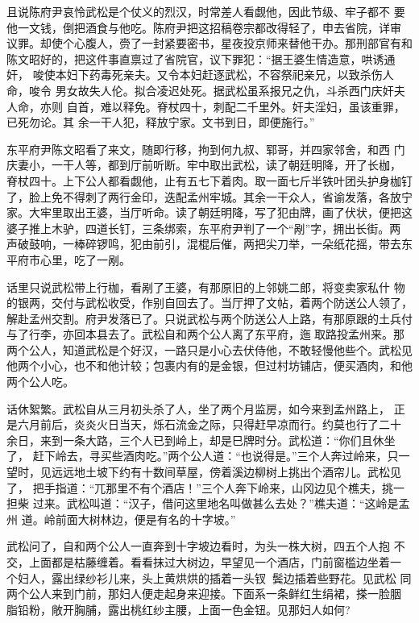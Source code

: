 且说陈府尹哀怜武松是个仗义的烈汉，时常差人看觑他，因此节级、牢子都不
要他一文钱，倒把酒食与他吃。陈府尹把这招稿卷宗都改得轻了，申去省院，详审
议罪。却使个心腹人，赍了一封紧要密书，星夜投京师来替他干办。那刑部官有和
陈文昭好的，把这件事直禀过了省院官，议下罪犯：“据王婆生情造意，哄诱通奸，
唆使本妇下药毒死亲夫。又令本妇赶逐武松，不容祭祀亲兄，以致杀伤人命，唆令
男女故失人伦。拟合凌迟处死。据武松虽系报兄之仇，斗杀西门庆奸夫人命，亦则
自首，难以释免。脊杖四十，刺配二千里外。奸夫淫妇，虽该重罪，已死勿论。其
余一干人犯，释放宁家。文书到日，即便施行。”

东平府尹陈文昭看了来文，随即行移，拘到何九叔、郓哥，并四家邻舍，和西
门庆妻小，一干人等，都到厅前听断。牢中取出武松，读了朝廷明降，开了长枷，
脊杖四十。上下公人都看觑他，止有五七下着肉。取一面七斤半铁叶团头护身枷钉
了，脸上免不得刺了两行金印，迭配孟州牢城。其余一干众人，省谕发落，各放宁
家。大牢里取出王婆，当厅听命。读了朝廷明降，写了犯由牌，画了伏状，便把这
婆子推上木驴，四道长钉，三条绑索，东平府尹判了一个“剐”字，拥出长街。两
声破鼓响，一棒碎锣鸣，犯由前引，混棍后催，两把尖刀举，一朵纸花摇，带去东
平府市心里，吃了一剐。

话里只说武松带上行枷，看剐了王婆，有那原旧的上邻姚二郎，将变卖家私什
物的银两，交付与武松收受，作别自回去了。当厅押了文帖，着两个防送公人领了，
解赴孟州交割。府尹发落已了。只说武松与两个防送公人上路，有那原跟的土兵付
与了行李，亦回本县去了。武松自和两个公人离了东平府，迤取路投孟州来。那
两个公人，知道武松是个好汉，一路只是小心去伏侍他，不敢轻慢他些个。武松见
他两个小心，也不和他计较；包裹内有的是金银，但过村坊铺店，便买酒肉，和他
两个公人吃。

话休絮繁。武松自从三月初头杀了人，坐了两个月监房，如今来到孟州路上，
正是六月前后，炎炎火日当天，烁石流金之际，只得赶早凉而行。约莫也行了二十
余日，来到一条大路，三个人已到岭上，却是巳牌时分。武松道：“你们且休坐了，
赶下岭去，寻买些酒肉吃。”两个公人道：“也说得是。”三个人奔过岭来，只一
望时，见远远地土坡下约有十数间草屋，傍着溪边柳树上挑出个酒帘儿。武松见了，
把手指道：“兀那里不有个酒店！”三个人奔下岭来，山冈边见个樵夫，挑一担柴
过来。武松叫道：“汉子，借问这里地名叫做甚么去处？”樵夫道：“这岭是孟州
道。岭前面大树林边，便是有名的十字坡。”

武松问了，自和两个公人一直奔到十字坡边看时，为头一株大树，四五个人抱
不交，上面都是枯藤缠着。看看抹过大树边，早望见一个酒店，门前窗槛边坐着一
个妇人，露出绿纱衫儿来，头上黄烘烘的插着一头钗，鬓边插着些野花。见武松
同两个公人来到门前，那妇人便走起身来迎接。下面系一条鲜红生绢裙，搽一脸胭
脂铅粉，敞开胸脯，露出桃红纱主腰，上面一色金钮。见那妇人如何?

